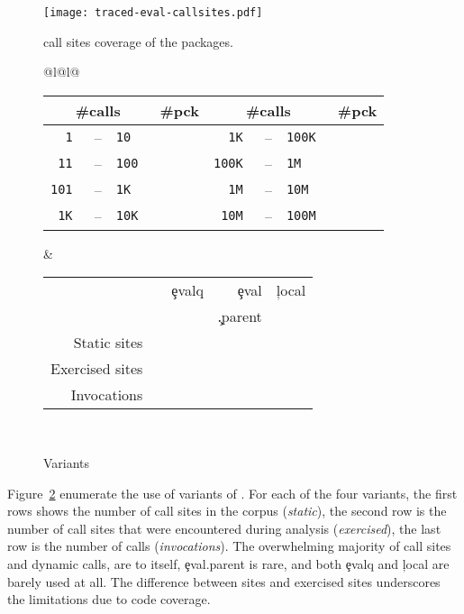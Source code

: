 \documentclass[screen,acmsmall]{acmart}
\begin{document}
\begin{figure}[tb]
  \centering
  \texttt{[image: traced-eval-callsites.pdf]}
  \centering
  \caption{\eval call sites coverage of the \PkgPackages packages.}%
  \label{fig:traced-eval-callsites}
\end{figure}

\begin{figure}[b]

\begin{tabular}{@{}l@{\hspace{1.5cm}}l@{}}
\begin{minipage} {5cm}
  \begin{tabular}{|r@{\,}r@{\,}l@{}r|r@{\,}r@{\,}l@{}r|} \hline
    \multicolumn{3}{|c}{\small\#calls} &\small \#pck
&     \multicolumn{3}{c}{\small\#calls} &\small\#pck \\\hline
\tt 1 &--& \tt 10      & \Bina  & \tt 1K &--&\tt 100K  & \Bine\\
\tt 11 &--& \tt 100    & \Binb  & \tt 100K &--&\tt 1M  & \Binf\\
\tt 101 &--& \tt 1K    & \Binc  & \tt 1M &--&\tt 10M   & \Bing\\
\tt 1K &--& \tt 10K    & \Bind  & \tt 10M &--& \tt 100M & \Binh\\\hline
\end{tabular}
\caption{Call frequency}\label{freq}
\end{minipage}
&
\begin{minipage}{7cm}
\begin{tabular}{|@{\,}r|rrrr|}\hline
  &\eval & \c{evalq} & \c{eval} & \c{local}\\[-2mm]
           & & & \c{.parent} &\\\hline
\small Static sites &\Staticeval&\Staticevalq&\Staticevalparent&\Staticlocal \\
\small Exercised sites&\Triggeredeval&\Triggeredevalq&\Triggeredevalparent&\Triggeredlocal\\
\small Invocations&\EvalsRnd&\EvalqsRnd&\EparentsRnd&\LocalsRnd\\\hline
\end{tabular}~\\[2mm]\caption{Variants}\label{tab:variantseval}
\end{minipage}\end{tabular}\end{figure}


Figure~\ref{tab:variantseval} enumerate the use of variants of \eval. For each
of the four variants, the first rows shows the number of call sites in the
corpus (\emph{static}), the second row is the number of call sites that were
encountered during analysis (\emph{exercised}), the last row is the number of
calls (\emph{invocations}). The overwhelming majority of call sites and dynamic
calls, are to \eval itself, \c{eval.parent} is rare, and both \c{evalq} and
\c{local} are barely used at all. The difference between sites and exercised
sites underscores the limitations due to code coverage.
\end{document}
